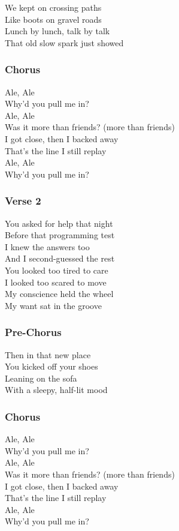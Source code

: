 We kept on crossing paths\\
Like boots on gravel roads\\
Lunch by lunch, talk by talk\\
That old slow spark just showed

\subsubsection{Chorus}\label{chorus-58}

Ale, Ale\\
Why'd you pull me in?\\
Ale, Ale\\
Was it more than friends? (more than friends)\\
I got close, then I backed away\\
That's the line I still replay\\
Ale, Ale\\
Why'd you pull me in?

\subsubsection{Verse 2}\label{verse-2-23}

You asked for help that night\\
Before that programming test\\
I knew the answers too\\
And I second-guessed the rest\\
You looked too tired to care\\
I looked too scared to move\\
My conscience held the wheel\\
My want sat in the groove

\subsubsection{Pre-Chorus}\label{pre-chorus-38}

Then in that new place\\
You kicked off your shoes\\
Leaning on the sofa\\
With a sleepy, half-lit mood

\subsubsection{Chorus}\label{chorus-59}

Ale, Ale\\
Why'd you pull me in?\\
Ale, Ale\\
Was it more than friends? (more than friends)\\
I got close, then I backed away\\
That's the line I still replay\\
Ale, Ale\\
Why'd you pull me in?

